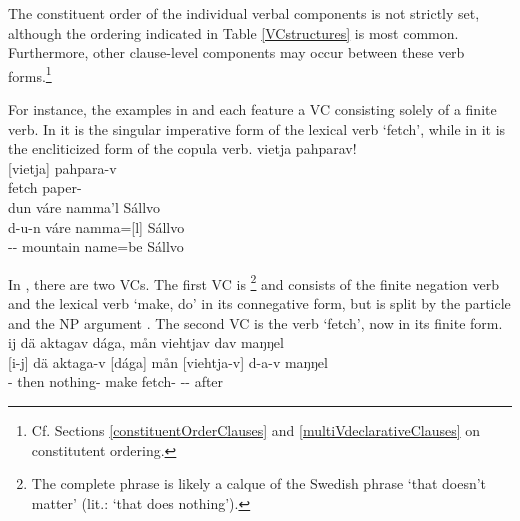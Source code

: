 \FloatBarrier
The constituent order of the individual verbal components is not strictly set, although the ordering indicated in Table \vref{VCstructures} is most common. Furthermore, other clause-level components may occur between these verb forms.\footnote{Cf. Sections \ref{constituentOrderClauses} and \ref{multiVdeclarativeClauses} on constitutent ordering.} 

For instance, the examples in  and  each feature a VC consisting solely of a finite verb. In  it is the singular imperative form of the lexical verb  ‘fetch’, while in  it is the encliticized  form of the copula verb. %
\ea\label{VCex1}
\glll	vietja pahparav!\\
	{[vietja]\subVC} pahpara-v\\
	fetch\BS{} paper-\\\nopagebreak
{}	
\z
\ea\label{VCex2}
\glll	dun váre namma'l Sállvo\\
	d-u-n váre {namma=[l]\subVC} Sállvo\\
	-- mountain\BS{} name\BS{}=be\BS{} Sállvo\BS{}\\\nopagebreak
{}	
\z

In , there are two VCs. The first VC is %
\footnote{The complete phrase  is likely a calque of the Swedish phrase  ‘that doesn’t matter’ (lit.: ‘that does nothing’).} %
and consists of the finite negation verb and the lexical verb  ‘make, do’ in its connegative form, but is split by the particle  and the NP argument . The second VC is the verb  ‘fetch’, now in its  finite form. 
\ea\label{VCex3}
\glll	ij dä aktagav dága, mån viehtjav dav maŋŋel\\
	{[i-j]\subVC{}} dä aktaga-v {[dága]\subVC{}} mån {[viehtja-v]\subVC{}} d-a-v maŋŋel\\
	- then nothing- make\BS{}  fetch- -- after\\\nopagebreak
{}	
\z

